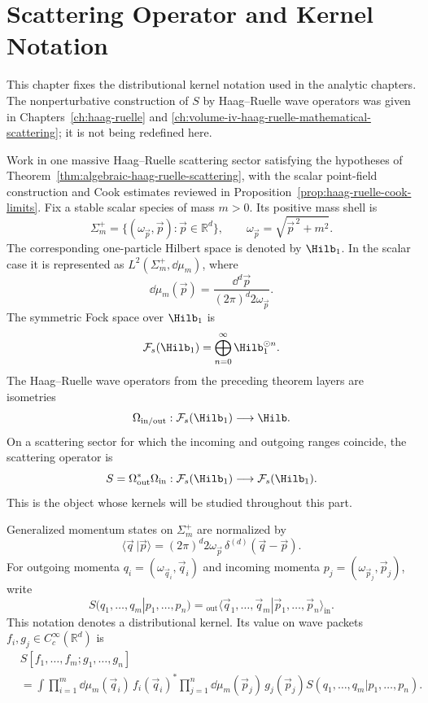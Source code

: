 \section{Scattering Operator and Kernel Notation}

This chapter fixes the distributional kernel notation used in the analytic
chapters.  The nonperturbative construction of \(S\) by Haag--Ruelle wave
operators was given in Chapters~\ref{ch:haag-ruelle} and
\ref{ch:volume-iv-haag-ruelle-mathematical-scattering}; it is not being
redefined here.

Work in one massive Haag--Ruelle scattering sector satisfying the hypotheses of
Theorem~\ref{thm:algebraic-haag-ruelle-scattering}, with the scalar
point-field construction and Cook estimates reviewed in
Proposition~\ref{prop:haag-ruelle-cook-limits}.  Fix a stable scalar
species of mass \(m>0\).  Its positive mass shell is
\[
  \Sigma_m^+
  =
  \{(\omega_{\vec p},\vec p):\vec p\in\mathbb R^d\},
  \qquad
  \omega_{\vec p}=\sqrt{\vec p^{\,2}+m^2}.
\]
The corresponding one-particle Hilbert space is denoted by \(\Hilb_1\).  In
the scalar case it is represented as \(L^2(\Sigma_m^+,\dd\mu_m)\), where
\[
  \dd\mu_m(\vec p)
  =
  \frac{\dd^d\vec p}{(2\pi)^d2\omega_{\vec p}} .
\]
The symmetric Fock space over \(\Hilb_1\) is
\[
  \mathcal F_s(\Hilb_1)
  =
  \bigoplus_{n=0}^\infty \Hilb_1^{\odot n}.
\]
The Haag--Ruelle wave operators from the preceding theorem layers
are isometries
\[
  \Omega_{\mathrm{in/out}}:
  \mathcal F_s(\Hilb_1)\longrightarrow \Hilb .
\]
On a scattering sector for which the incoming and outgoing ranges coincide,
the scattering operator is
\[
  S=\Omega_{\mathrm{out}}^*\Omega_{\mathrm{in}}
  :
  \mathcal F_s(\Hilb_1)\longrightarrow\mathcal F_s(\Hilb_1).
\]
This is the object whose kernels will be studied throughout this part.

Generalized momentum states on \(\Sigma_m^+\) are normalized by
\[
  \langle\vec q\,|\vec p\rangle
  =
  (2\pi)^d2\omega_{\vec p}\,\delta^{(d)}(\vec q-\vec p).
\]
For outgoing momenta \(q_i=(\omega_{\vec q_i},\vec q_i)\) and incoming
momenta \(p_j=(\omega_{\vec p_j},\vec p_j)\), write
\[
  S(q_1,\ldots,q_m|p_1,\ldots,p_n)
  =
  {}_{\mathrm{out}}\langle
  \vec q_1,\ldots,\vec q_m
  |\vec p_1,\ldots,\vec p_n
  \rangle_{\mathrm{in}} .
\]
This notation denotes a distributional kernel. Its value on wave packets
\(f_i,g_j\in C_c^\infty(\mathbb R^d)\) is
\[
\begin{aligned}
&S[f_1,\ldots,f_m;g_1,\ldots,g_n]
\\
&=
  \int
  \prod_{i=1}^m\dd\mu_m(\vec q_i)\,f_i(\vec q_i)^*
  \prod_{j=1}^n\dd\mu_m(\vec p_j)\,g_j(\vec p_j)
  S(q_1,\ldots,q_m|p_1,\ldots,p_n).
\end{aligned}
\]


